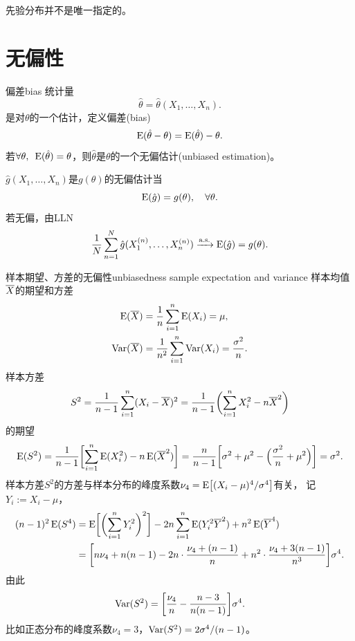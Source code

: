 \begin{remark}
	先验分布并不是唯一指定的。
\end{remark}

\section{无偏性}

\begin{definition}{偏差}{bias}
	统计量
	\[
		\hat\theta = \hat\theta(X_1,\ldots,X_n).
	\]
	是对$\theta$的一个估计，定义偏差(bias)%
	\begin{equation}
		\operatorname{E}(\hat\theta - \theta) = \operatorname{E}(\hat\theta) - \theta.
	\end{equation}
	若$\forall\theta,\enspace\operatorname{E}(\hat\theta) = \theta$，则$\hat\theta$是$\theta$的一个无偏估计(unbiased estimation)。
\end{definition}
$\hat g(X_1,\ldots,X_n)$是$g(\theta)$的无偏估计当
\begin{equation}\label{eq:ps-unbiased-estimator}
	\operatorname{E}(\hat g) = g(\theta),\quad\forall\theta.
\end{equation}
若无偏，由LLN
\[
	\frac1{N}\sum_{n=1}^N\hat g(X_1^{(n)},\ldots,X_n^{(n)}) \xrightarrow{\text{a.s.}} \operatorname{E}(\hat g) = g(\theta).
\]
\begin{example}{样本期望、方差的无偏性}{unbiasedness sample expectation and variance}
	样本均值$\overline{X}$的期望和方差
	\begin{subequations}
		\begin{align}
			\label{eqn:E(avg X)}
			\operatorname{E}(\overline{X}) &= \frac1n\sum_{i=1}^n\operatorname{E}(X_i) = \mu,\\
			\label{eqn:Var(avg X)}
			\operatorname{Var}(\overline{X}) &= \frac1{n^2}\sum_{i=1}^n\operatorname{Var}(X_i) = \frac{\sigma^2}n.
		\end{align}
	\end{subequations}
	样本方差
	\[
		S^2 = \frac1{n - 1}\sum_{i=1}^n(X_i - \overline{X})^2 = \frac1{n - 1}\biggl(\sum_{i=1}^nX_i^2 - n\overline{X}^2\biggr)
	\]
	的期望
	\begin{equation}
		\label{eqn:E(S2)}
		\operatorname{E}(S^2) = \frac1{n - 1}\biggl[\sum_{i=1}^n\operatorname{E}(X_i^2) - n\operatorname{E}(\overline{X}^2)\biggr] = \frac n{n - 1}\biggl[\sigma^2 + \mu^2 - \Bigl(\frac{\sigma^2}n + \mu^2\Bigr)\biggr] = \sigma^2.
	\end{equation}
	样本方差$S^2$的方差与样本分布的峰度系数$\nu_4 = \operatorname{E}\bigl[(X_i - \mu)^4/\sigma^4\bigr]$有关，
	记$Y_i := X_i - \mu$，
	\begin{align*}
		(n - 1)^2\operatorname{E}(S^4) &= \operatorname{E}\biggl[\biggl(\sum_{i=1}^nY_i^2\biggr)^2\biggr] - 2n\sum_{i=1}^n\operatorname{E}(Y_i^2\overline{Y}^2) + n^2\operatorname{E}(\overline{Y}^4)\\
		&= \biggl[n\nu_4 + n(n - 1) - 2n \cdot \frac{\nu_4 + (n - 1)}n + n^2 \cdot \frac{\nu_4 + 3(n - 1)}{n^3}\biggr]\sigma^4.
	\end{align*}
	由此
	\begin{equation}
		\label{eqn:Var(S2)}
		\operatorname{Var}(S^2) = \biggl[\frac{\nu_4}n - \frac{n - 3}{n(n - 1)}\biggr]\sigma^4.
	\end{equation}
	比如正态分布的峰度系数$\nu_4 = 3$，$\operatorname{Var}(S^2) = 2\sigma^4/(n - 1)$。
\end{example}
